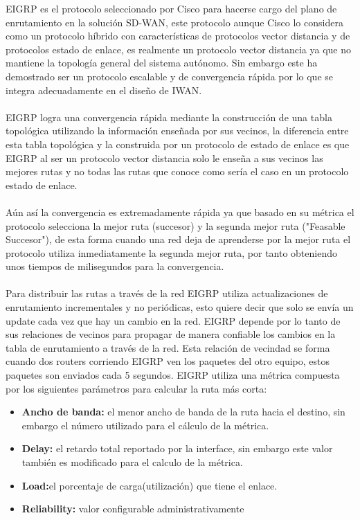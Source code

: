 EIGRP es el protocolo seleccionado por Cisco para hacerse cargo del plano de enrutamiento en la solución SD-WAN, este protocolo aunque Cisco lo considera como un protocolo híbrido con características de protocolos vector distancia y de protocolos estado de enlace, es realmente un protocolo vector distancia ya que no mantiene la topología general del sistema autónomo. Sin embargo este ha demostrado ser un protocolo escalable y de convergencia rápida por lo que se integra adecuadamente en el diseño de IWAN.
\\
\\
EIGRP logra una convergencia rápida mediante la construcción de una tabla topológica utilizando la información enseñada por sus vecinos, la diferencia entre esta tabla topológica y la construida por un protocolo de estado de enlace es que  EIGRP al ser un protocolo vector distancia solo le enseña a sus vecinos las mejores rutas y no todas las rutas que conoce como sería el caso en un protocolo estado de enlace. 
\\
\\
Aún así la convergencia es extremadamente rápida ya que basado en su métrica el protocolo selecciona la mejor ruta (succesor) y la segunda mejor ruta ("Feasable Succesor"), de esta forma cuando una red deja de aprenderse por la mejor ruta el protocolo utiliza inmediatamente la segunda mejor ruta, por tanto obteniendo unos tiempos de milisegundos para la convergencia.
\\
\\
Para distribuir las rutas a través de la red EIGRP utiliza actualizaciones de enrutamiento incrementales y no periódicas, esto quiere decir que solo se envía un update cada vez que hay un cambio en la red. EIGRP depende por lo tanto de sus relaciones de vecinos para propagar de manera confiable los cambios en la tabla de enrutamiento a través de la red. Esta relación de vecindad se forma cuando dos routers corriendo EIGRP ven los paquetes del otro equipo, estos paquetes son enviados cada 5 segundos.
EIGRP utiliza una métrica compuesta por los siguientes parámetros para calcular la ruta más corta:

\begin{itemize}
\item\textbf{Ancho de banda:} el menor ancho de banda de la ruta hacia el destino, sin embargo el número utilizado para el cálculo de la métrica.
\item\textbf{Delay:} el retardo total reportado por la interface, sin embargo este valor también es modificado para el calculo de la métrica.
\item\textbf{Load:}el porcentaje de carga(utilización) que tiene el enlace.
\item\textbf{Reliability:} valor configurable administrativamente
\end{itemize}


